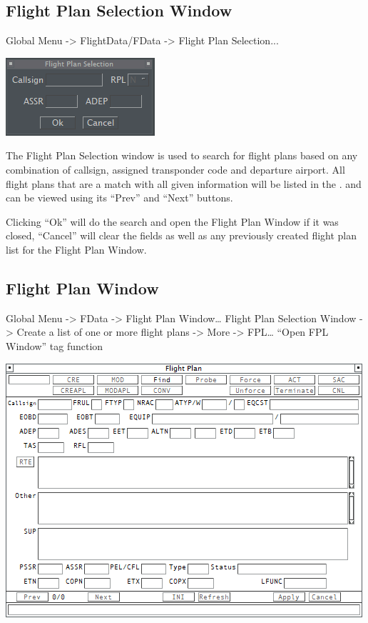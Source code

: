 \documentclass[11pt,a4paper]{memoir}
\begin{document}
\subsection{Flight Plan Selection Window}
\label{win:fpsw}

Global Menu -> FlightData/FData -> Flight Plan Selection...

\includegraphics{img/fpsel.png}

The Flight Plan Selection window is used to search for flight plans based on any combination of callsign, assigned transponder code and departure airport. All flight plans that are a match with all given information will be listed in the \textit{}. and can be viewed using its “Prev” and “Next” buttons.

Clicking “Ok” will do the search and open the Flight Plan Window if it was closed, “Cancel” will clear the fields as well as any previously created flight plan list for the Flight Plan Window.

\subsection{Flight Plan Window}
\label{win:fpw}

Global Menu -> FData -> Flight Plan Window… 
Flight Plan Selection Window -> Create a list of one or more flight plans 
\textit{} -> More -> FPL… 
“Open FPL Window” tag function

\includegraphics{img/fpl.png}
\end{document}
